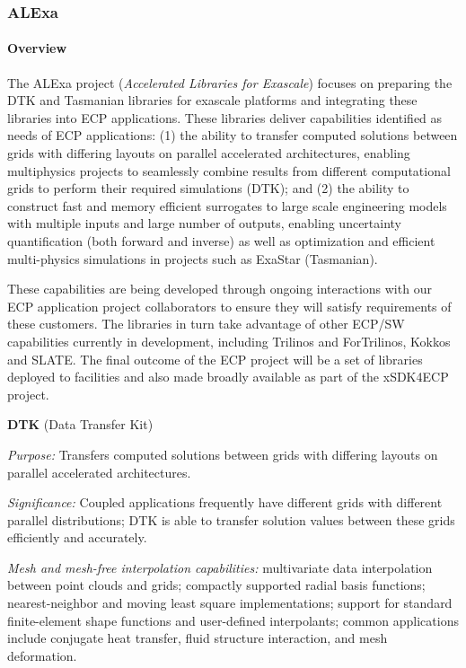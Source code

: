 \subsubsection{ ALExa}


\paragraph{Overview}

The ALExa project ({\sl Accelerated Libraries for Exascale}) focuses on
preparing the DTK and Tasmanian libraries for exascale platforms and
integrating these libraries into ECP applications.  These libraries deliver
capabilities identified as needs of ECP applications: (1) the ability to
transfer computed solutions between grids with differing layouts on parallel
accelerated architectures, enabling multiphysics projects to seamlessly
combine results from different computational grids to perform their required
simulations (DTK); and
%
(2) the ability to construct fast and memory efficient surrogates to large
scale engineering models with multiple inputs and large number of outputs,
enabling uncertainty quantification (both forward and inverse) as well as
optimization and efficient multi-physics simulations in projects such as
ExaStar (Tasmanian).

These capabilities are being developed through ongoing interactions with our
ECP application project collaborators to ensure they will satisfy requirements
of these customers.  The libraries in turn take advantage of other ECP/SW
capabilities currently in development, including Trilinos and ForTrilinos,
Kokkos and SLATE.  The final outcome of the ECP project will be a set of
libraries deployed to facilities and also made broadly available as part of
the xSDK4ECP project.


{\bf DTK} (Data Transfer Kit)

{\it Purpose:} Transfers computed solutions between grids with differing
layouts on parallel accelerated architectures.

{\it Significance:} Coupled applications frequently have different grids with
different parallel distributions; DTK is able to transfer solution values
between these grids efficiently and accurately.

{\it Mesh and mesh-free interpolation capabilities:} multivariate data
interpolation between point clouds and grids; compactly supported radial basis
functions; nearest-neighbor and moving least square implementations; support
for standard finite-element shape functions and user-defined interpolants;
common applications include conjugate heat transfer, fluid structure
interaction, and mesh deformation.

